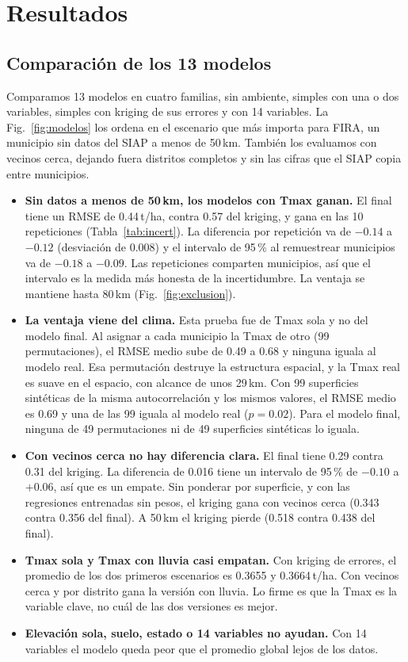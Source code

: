 \section{Resultados}\label{sec:resultados}

\subsection{Comparación de los 13 modelos}

Comparamos 13 modelos en cuatro familias, sin ambiente, simples con una o dos variables, simples con kriging de sus
errores y con 14 variables. La Fig.~\ref{fig:modelos} los ordena en el escenario que más importa para FIRA, un
municipio sin datos del SIAP a menos de 50\,km. También los evaluamos con vecinos cerca, dejando fuera distritos
completos y sin las cifras que el SIAP copia entre municipios.
\begin{itemize}
\item \textbf{Sin datos a menos de 50\,km, los modelos con Tmax ganan.} El final tiene un RMSE de 0.44\,t/ha, contra
0.57 del kriging, y gana en las 10 repeticiones (Tabla~\ref{tab:incert}). La diferencia por repetición va de $-0.14$ a
$-0.12$ (desviación de 0.008) y el intervalo de 95\,\% al remuestrear municipios va de $-0.18$ a $-0.09$. Las
repeticiones comparten municipios, así que el intervalo es la medida más honesta de la incertidumbre. La ventaja se
mantiene hasta 80\,km (Fig.~\ref{fig:exclusion}).
\item \textbf{La ventaja viene del clima.} Esta prueba fue de Tmax sola y no del modelo final. Al asignar a cada
municipio la Tmax de otro (99 permutaciones), el RMSE medio sube de 0.49 a 0.68 y ninguna iguala al modelo real. Esa
permutación destruye la estructura espacial, y la Tmax real es suave en el espacio, con alcance de unos 29\,km. Con 99
superficies sintéticas de la misma autocorrelación y los mismos valores, el RMSE medio es 0.69 y una de las 99 iguala
al modelo real ($p = 0.02$). Para el modelo final, ninguna de 49 permutaciones ni de 49 superficies sintéticas lo
iguala.
\item \textbf{Con vecinos cerca no hay diferencia clara.} El final tiene 0.29 contra 0.31 del kriging. La diferencia de
0.016 tiene un intervalo de 95\,\% de $-0.10$ a $+0.06$, así que es un empate. Sin ponderar por superficie, y con las
regresiones entrenadas sin pesos, el kriging gana con vecinos cerca (0.343 contra 0.356 del final). A 50\,km el kriging pierde
(0.518 contra 0.438 del final).
\item \textbf{Tmax sola y Tmax con lluvia casi empatan.} Con kriging de errores, el promedio de los dos primeros
escenarios es 0.3655 y 0.3664\,t/ha. Con vecinos cerca y por distrito gana la versión con lluvia. Lo firme es que la Tmax
es la variable clave, no cuál de las dos versiones es mejor.
\item \textbf{Elevación sola, suelo, estado o 14 variables no ayudan.} Con 14 variables el modelo queda peor que el
promedio global lejos de los datos.
\end{itemize}

